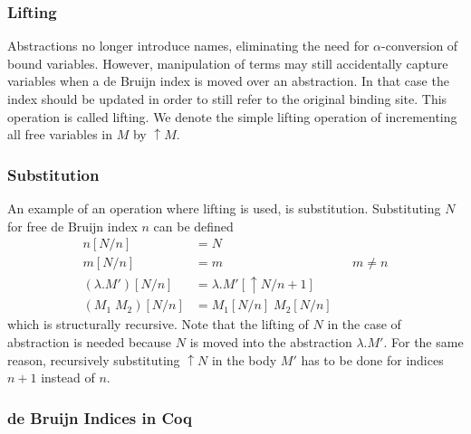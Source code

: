 \documentclass[a4paper,11pt]{article}
\begin{document}
\subsubsection*{Lifting}

Abstractions no longer introduce names, eliminating the need for
$\alpha$-conversion of bound variables.
However, manipulation of terms may still accidentally capture
variables when a de Bruijn index is moved over an abstraction.
In that case the index should be updated in order to still refer to the
original binding site.
This operation is called lifting. We denote the simple lifting operation
of incrementing all free variables in $M$ by $\uparrow \! M$.


\subsubsection*{Substitution}

An example of an operation where lifting is used, is substitution.
Substituting $N$ for free de Bruijn index $n$ can be defined
\begin{align*}
  n[N/n]             &= N\\
  m[N/n]             &= m                    && \text{$m \neq n$} \\
  (\lambda .M')[N/n] &= \lambda .M'[\uparrow \! N / n\!+\!1]\\
  (M_1 \; M_2)[N/n]  &= M_1[N/n] \; M_2[N/n]
\end{align*}
which is structurally recursive.
Note that the lifting of $N$ in the case of abstraction is needed because
$N$ is moved into the abstraction $\lambda.M'$.
For the same reason, recursively substituting $\uparrow \! N$ in the body
$M'$ has to be done for indices $n+1$ instead of $n$.

\subsubsection*{de Bruijn Indices in Coq}
\end{document}

